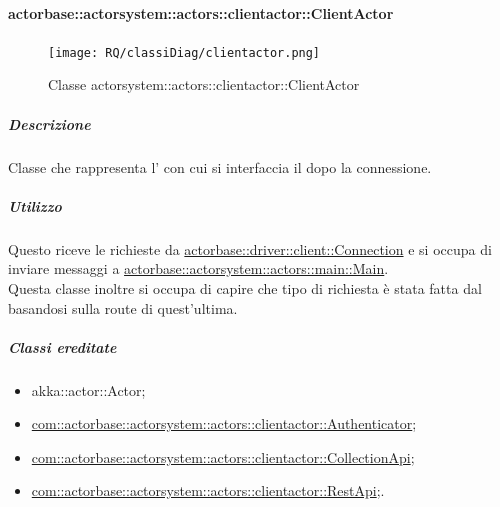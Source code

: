 \documentclass{scalatekids-article}
\begin{document}
\paragraph{actorbase::actorsystem::actors::clientactor::ClientActor}
\label{sec:actorbase::actorsystem::actors::clientactor::ClientActor}

\begin{figure}[H]
  \begin{center}
    \texttt{[image: RQ/classiDiag/clientactor.png]}
    \caption{Classe actorsystem::actors::clientactor::ClientActor}
  \end{center}
\end{figure}

\subparagraph{Descrizione}

Classe che rappresenta l' con cui si interfaccia il  dopo
la connessione.

\subparagraph{Utilizzo}

Questo  riceve le richieste da \hyperref[sec:actorbase::driver::client::Connection]{actorbase::driver::client::Connection}
e si occupa di inviare messaggi a \hyperref[sec:actorbase::actorsystem::actors::main::Main]{actorbase::actorsystem::actors::main::Main}. \\
Questa classe inoltre si occupa di capire che tipo di richiesta è stata fatta dal  basandosi sulla route di quest'ultima.

\subparagraph{Classi ereditate}

\begin{itemize}

\item akka::actor::Actor;
\item \hyperref[com::actorbase::actorsystem::actors::clientactor::Authenticator]{com::actorbase::actorsystem::actors::clientactor::Authenticator};
\item \hyperref[com::actorbase::actorsystem::actors::clientactor::CollectionApi]{com::actorbase::actorsystem::actors::clientactor::CollectionApi};
\item \hyperref[com::actorbase::actorsystem::actors::clientactor::RestApi]{com::actorbase::actorsystem::actors::clientactor::RestApi};.

\end{itemize}
\end{document}

